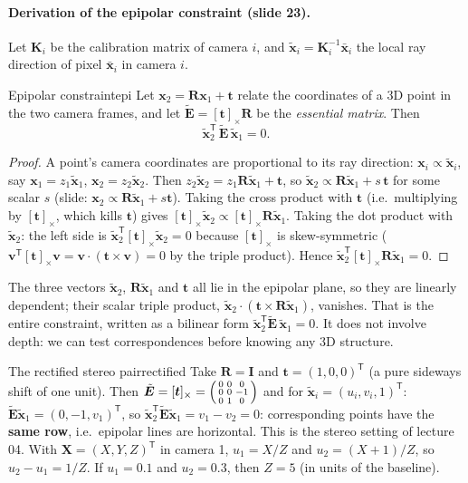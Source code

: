 \documentclass[11pt,a4paper]{article}
\newcommand{\xb}{\bar{\bm{x}}}      %
\newcommand{\xt}{\tilde{\bm{x}}}    %
\newcommand{\E}{\tilde{\bm E}}
\newcommand{\sk}[1]{[#1]_{\times}}
\newcommand{\tr}{^{\mathsf T}}
\begin{document}
\paragraph{Derivation of the epipolar constraint (slide 23).}
Let $\bm K_i$ be the calibration matrix of camera $i$, and $\xt_i=\bm K_i^{-1}\xb_i$ the local ray direction of pixel $\xb_i$ in camera $i$.

\begin{theorem}{Epipolar constraint}{epi}
Let $\bm x_2=\bm R\bm x_1+\bm t$ relate the coordinates of a 3D point in the two camera frames, and let $\E=\sk{\bm t}\bm R$ be the \emph{essential matrix}. Then
\[
\xt_2\tr\,\E\,\xt_1=0 .
\]
\end{theorem}
\begin{proof}
A point's camera coordinates are proportional to its ray direction: $\bm x_i\propto\xt_i$, say $\bm x_1=z_1\xt_1$, $\bm x_2=z_2\xt_2$. Then
$z_2\xt_2=z_1\bm R\xt_1+\bm t$, so $\xt_2\propto\bm R\xt_1+s\,\bm t$ for some scalar $s$ (slide: $\bm x_2\propto\bm R\xt_1+s\bm t$).
Taking the cross product with $\bm t$ (i.e.\ multiplying by $\sk{\bm t}$, which kills $\bm t$) gives $\sk{\bm t}\xt_2\propto\sk{\bm t}\bm R\xt_1$.
Taking the dot product with $\xt_2$: the left side is $\xt_2\tr\sk{\bm t}\xt_2=0$ because $\sk{\bm t}$ is skew-symmetric
($\bm v\tr\sk{\bm t}\bm v=\bm v\cdot(\bm t\times\bm v)=0$ by the triple product). Hence $\xt_2\tr\sk{\bm t}\bm R\xt_1=0$.
\end{proof}

\begin{intuition}
The three vectors $\xt_2$, $\bm R\xt_1$ and $\bm t$ all lie in the epipolar plane, so they are linearly dependent; their scalar triple product, $\xt_2\cdot(\bm t\times\bm R\xt_1)$, vanishes.
That is the entire constraint, written as a bilinear form $\xt_2\tr\E\,\xt_1=0$. It does not involve depth: we can test correspondences before knowing any 3D structure.
\end{intuition}

\begin{example}{The rectified stereo pair}{rectified}
Take $\bm R=\bm I$ and $\bm t=(1,0,0)\tr$ (a pure sideways shift of one unit). Then
$\E=\sk{\bm t}=\begin{psmallmatrix}0&0&0\\0&0&-1\\0&1&0\end{psmallmatrix}$ and for $\xt_i=(u_i,v_i,1)\tr$:
$\E\xt_1=(0,-1,v_1)\tr$, so $\xt_2\tr\E\xt_1=v_1-v_2=0$: corresponding points have the \textbf{same row}, i.e.\ epipolar lines are horizontal.
This is the stereo setting of lecture 04. With $\bm X=(X,Y,Z)\tr$ in camera 1, $u_1=X/Z$ and $u_2=(X+1)/Z$, so $u_2-u_1=1/Z$. If $u_1=0.1$ and $u_2=0.3$, then $Z=5$ (in units of the baseline).
\end{example}
\end{document}
